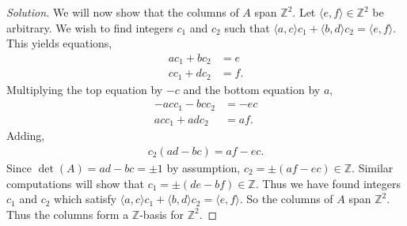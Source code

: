 \documentclass[12pt]{article}
\newcommand{\Z}{\mathbb{Z}}
\newenvironment{exercise}[2][Exercise]{\begin{trivlist}
        \item[\hskip \labelsep {\bfseries #1}\hskip \labelsep {\bfseries #2.}]}{\end{trivlist}}
\newenvironment{solution}
        {\begin{proof}[Solution]}
                    {\end{proof}}
\begin{document}
\begin{exercise}{38}
\begin{enumerate}[label=(\alph*)]
\begin{solution}
            We will now show that the columns of \( A \) span \( \Z^{2} . \) Let \( \langle e,f \rangle \in \Z^{2} \) be arbitrary. We wish to find integers \( c_{1} \) and \( c_{2} \) such that \( \langle a,c \rangle c_{1} + \langle b,d \rangle c_{2} = \langle e,f \rangle . \) This yields equations,
            \begin{align*}
                ac_{1} + b c_{2} &= e\\
                c c_{1} + d c_{2} &= f.
            \end{align*}
            Multiplying the top equation by \( -c  \) and the bottom equation by \( a , \)
            \begin{align*}
                -acc_{1} - bcc_{2} &= -ec\\
                acc_{1} + adc_{2} &= af.
            \end{align*}
            Adding,
            \begin{align*}
                c_{2} ( ad-bc ) = af - ec.
            \end{align*}
            Since \( \det(A) = ad-bc = \pm 1 \) by assumption, \( c_{2} = \pm (af-ec) \in \Z. \) Similar computations will show that \( c_{1} = \pm ( de - bf ) \in \Z  . \) Thus we have found integers \( c_{1} \) and \( c_{2} \) which satisfy \( \langle a,c \rangle c_{1} + \langle b,d \rangle c_{2} = \langle e,f \rangle . \) So the columns of \( A \) span \( \Z^{2} . \) Thus the columns form a \( \Z \)-basis for \( \Z^{2} . \)
        \end{solution}
    \end{enumerate}
\end{exercise}\pagebreak
\end{document}
